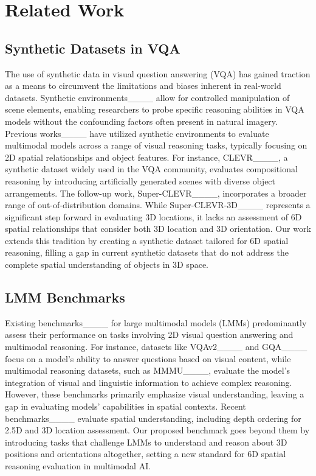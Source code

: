 \section{Related Work}
\subsection{Synthetic Datasets in VQA}
The use of synthetic data in visual question answering (VQA) has gained traction as a means to circumvent the limitations and biases inherent in real-world datasets. Synthetic environments____ allow for controlled manipulation of scene elements, enabling researchers to probe specific reasoning abilities in VQA models without the confounding factors often present in natural imagery. Previous works____ have utilized synthetic environments to evaluate multimodal models across a range of visual reasoning tasks, typically focusing on 2D spatial relationships and object features. For instance, CLEVR____, a synthetic dataset widely used in the VQA community, evaluates compositional reasoning by introducing artificially generated scenes with diverse object arrangements. The follow-up work, Super-CLEVR____, incorporates a broader range of out-of-distribution domains. While Super-CLEVR-3D____ represents a significant step forward in evaluating 3D locations, it lacks an assessment of 6D spatial relationships that consider both 3D location and 3D orientation. Our work extends this tradition by creating a synthetic dataset tailored for 6D spatial reasoning, filling a gap in current synthetic datasets that do not address the complete spatial understanding of objects in 3D space.

\subsection{LMM Benchmarks}
Existing benchmarks____ for large multimodal models (LMMs) predominantly assess their performance on tasks involving 2D visual question answering and multimodal reasoning. For instance, datasets like VQAv2____ and GQA____ focus on a model's ability to answer questions based on visual content, while multimodal reasoning datasets, such as MMMU____, evaluate the model's integration of visual and linguistic information to achieve complex reasoning. However, these benchmarks primarily emphasize visual understanding, leaving a gap in evaluating models' capabilities in spatial contexts. Recent benchmarks____ evaluate spatial understanding, including depth ordering for 2.5D and 3D location assessment. Our proposed benchmark goes beyond them by introducing tasks that challenge LMMs to understand and reason about 3D positions and orientations altogether, setting a new standard for 6D spatial reasoning evaluation in multimodal AI.


\vspace{-0.3em}